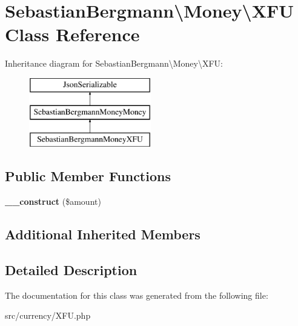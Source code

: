 \hypertarget{classSebastianBergmann_1_1Money_1_1XFU}{}\section{Sebastian\+Bergmann\textbackslash{}Money\textbackslash{}X\+F\+U Class Reference}
\label{classSebastianBergmann_1_1Money_1_1XFU}
Inheritance diagram for Sebastian\+Bergmann\textbackslash{}Money\textbackslash{}X\+F\+U\+:\begin{figure}[H]
\begin{center}
\leavevmode
\includegraphics[height=3.000000cm]{classSebastianBergmann_1_1Money_1_1XFU}
\end{center}
\end{figure}
\subsection*{Public Member Functions}
\begin{DoxyCompactItemize}
\item 
\hypertarget{classSebastianBergmann_1_1Money_1_1XFU_a06cada7bf9fb240189da8a6aaf0560e3}{}{\bfseries \+\_\+\+\_\+construct} (\$amount)\label{classSebastianBergmann_1_1Money_1_1XFU_a06cada7bf9fb240189da8a6aaf0560e3}

\end{DoxyCompactItemize}
\subsection*{Additional Inherited Members}


\subsection{Detailed Description}


The documentation for this class was generated from the following file\+:\begin{DoxyCompactItemize}
\item 
src/currency/X\+F\+U.\+php\end{DoxyCompactItemize}
